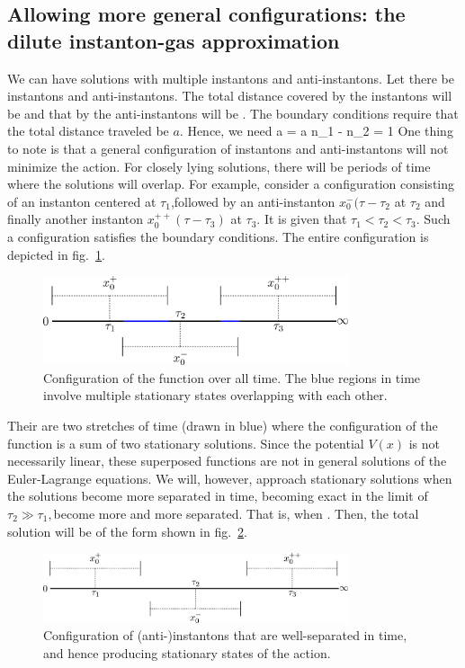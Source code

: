 \documentclass[12pt]{article}
\begin{document}
\subsection*{Allowing more general configurations: the dilute instanton-gas approximation}
We can have solutions with multiple instantons and anti-instantons. Let there be  instantons and  anti-instantons. The total distance covered by the instantons will be  and that by the anti-instantons will be . The boundary conditions require that the total distance traveled be \(a\). Hence, we need 
\beq
 a  =  a \implies n_1 - n_2 = 1
\eeq
One thing to note is that a general configuration of instantons and anti-instantons will not minimize the action. For closely lying solutions, there will be periods of time where the solutions will overlap. For example, consider a configuration consisting of an instanton  centered at \(\tau_1\),followed by an anti-instanton \(x_0^-(\tau - \tau_2\) at \(\tau_2\) and finally another instanton \(x_0^{++}(\tau - \tau_3)\) at \(\tau_3\). It is given that \(\tau_1 < \tau_2 < \tau_3\). Such a configuration satisfies the boundary conditions. The entire configuration is depicted in fig.~\ref{conf}.
\begin{figure}[htpb]
	\centering
	\includegraphics[width=0.8\textwidth]{./instantons.png}
	\caption{Configuration of the function over all time. The blue regions in time involve multiple stationary states overlapping with each other.}
	\label{conf}
\end{figure}
Their are two stretches of time (drawn in blue) where the configuration of the function is a sum of two stationary solutions. Since the potential \(V(x)\) is not necessarily linear, these superposed functions are not in general solutions of the Euler-Lagrange equations. We will, however, approach stationary solutions when the solutions become more separated in time, becoming exact in the limit of \(\tau_2 \gg \tau_1, \)become more and more separated. That is, when  . Then, the total solution will be of the form shown in fig.~\ref{conf2}.
\begin{figure}[htpb!]
	\centering
	\includegraphics[width=0.8\textwidth]{./instantons2.png}
	\caption{Configuration of (anti-)instantons that are well-separated in time, and hence producing stationary states of the action.}
	\label{conf2}
\end{figure}
\end{document}
